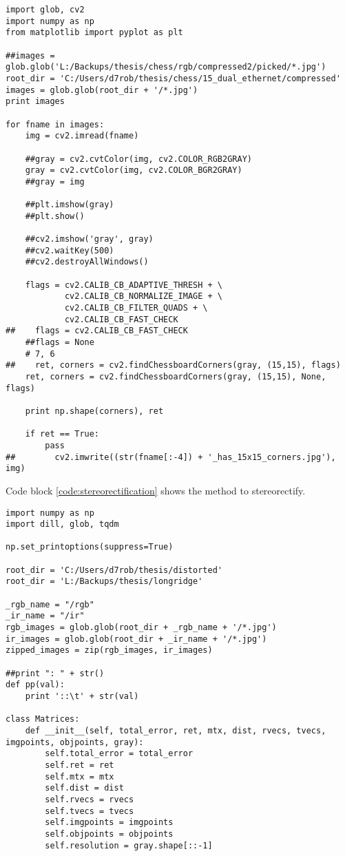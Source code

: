 \begin{appendices}
\begin{lstlisting}
import glob, cv2
import numpy as np
from matplotlib import pyplot as plt

##images = glob.glob('L:/Backups/thesis/chess/rgb/compressed2/picked/*.jpg')
root_dir = 'C:/Users/d7rob/thesis/chess/15_dual_ethernet/compressed'
images = glob.glob(root_dir + '/*.jpg')
print images

for fname in images:
    img = cv2.imread(fname)

    ##gray = cv2.cvtColor(img, cv2.COLOR_RGB2GRAY)
    gray = cv2.cvtColor(img, cv2.COLOR_BGR2GRAY)
    ##gray = img

    ##plt.imshow(gray)
    ##plt.show()

    ##cv2.imshow('gray', gray)
    ##cv2.waitKey(500)
    ##cv2.destroyAllWindows()

    flags = cv2.CALIB_CB_ADAPTIVE_THRESH + \
            cv2.CALIB_CB_NORMALIZE_IMAGE + \
            cv2.CALIB_CB_FILTER_QUADS + \
            cv2.CALIB_CB_FAST_CHECK
##    flags = cv2.CALIB_CB_FAST_CHECK
    ##flags = None
    # 7, 6
##    ret, corners = cv2.findChessboardCorners(gray, (15,15), flags)
    ret, corners = cv2.findChessboardCorners(gray, (15,15), None, flags)

    print np.shape(corners), ret

    if ret == True:
        pass
##        cv2.imwrite((str(fname[:-4]) + '_has_15x15_corners.jpg'), img)

\end{lstlisting}

\newpage
Code block \ref{code:stereorectification} shows the method to stereorectify.

\begin{lstlisting}
import numpy as np
import dill, glob, tqdm

np.set_printoptions(suppress=True)

root_dir = 'C:/Users/d7rob/thesis/distorted'
root_dir = 'L:/Backups/thesis/longridge'

_rgb_name = "/rgb"
_ir_name = "/ir"
rgb_images = glob.glob(root_dir + _rgb_name + '/*.jpg')
ir_images = glob.glob(root_dir + _ir_name + '/*.jpg')
zipped_images = zip(rgb_images, ir_images)

##print ": " + str()
def pp(val):
    print '::\t' + str(val)

class Matrices:
    def __init__(self, total_error, ret, mtx, dist, rvecs, tvecs, imgpoints, objpoints, gray):
        self.total_error = total_error
        self.ret = ret
        self.mtx = mtx
        self.dist = dist
        self.rvecs = rvecs
        self.tvecs = tvecs
        self.imgpoints = imgpoints
        self.objpoints = objpoints
        self.resolution = gray.shape[::-1]


\end{lstlisting}
\end{appendices}
